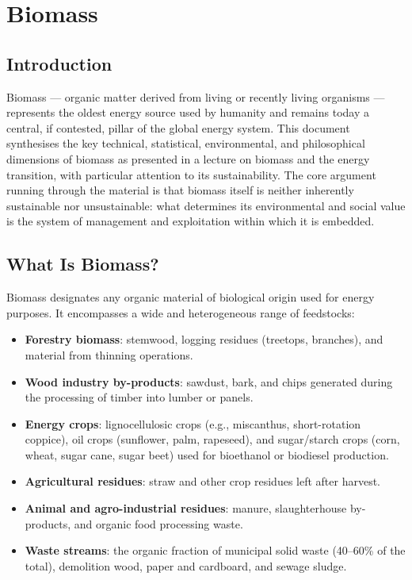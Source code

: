 \chapter{Biomass}

\section{Introduction}

Biomass — organic matter derived from living or recently living organisms — represents the oldest energy source used by humanity and remains today a central, if contested, pillar of the global energy system. This document synthesises the key technical, statistical, environmental, and philosophical dimensions of biomass as presented in a lecture on biomass and the energy transition, with particular attention to its sustainability. The core argument running through the material is that biomass itself is neither inherently sustainable nor unsustainable: what determines its environmental and social value is the system of management and exploitation within which it is embedded.

\section{What Is Biomass?}

Biomass designates any organic material of biological origin used for energy purposes. It encompasses a wide and heterogeneous range of feedstocks:

\begin{itemize}
    \item \textbf{Forestry biomass}: stemwood, logging residues (treetops, branches), and material from thinning operations.
    \item \textbf{Wood industry by-products}: sawdust, bark, and chips generated during the processing of timber into lumber or panels.
    \item \textbf{Energy crops}: lignocellulosic crops (e.g., miscanthus, short-rotation coppice), oil crops (sunflower, palm, rapeseed), and sugar/starch crops (corn, wheat, sugar cane, sugar beet) used for bioethanol or biodiesel production.
    \item \textbf{Agricultural residues}: straw and other crop residues left after harvest.
    \item \textbf{Animal and agro-industrial residues}: manure, slaughterhouse by-products, and organic food processing waste.
    \item \textbf{Waste streams}: the organic fraction of municipal solid waste (40–60\% of the total), demolition wood, paper and cardboard, and sewage sludge.
\end{itemize}

